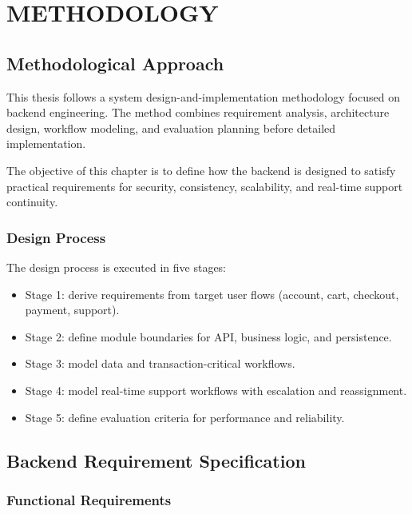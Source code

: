 ﻿\chapter{METHODOLOGY}
\label{ch:methodology}

\section{Methodological Approach}

This thesis follows a system design-and-implementation methodology focused on backend engineering. The method combines requirement analysis, architecture design, workflow modeling, and evaluation planning before detailed implementation.

The objective of this chapter is to define how the backend is designed to satisfy practical requirements for security, consistency, scalability, and real-time support continuity.

\subsection{Design Process}

The design process is executed in five stages:
\begin{itemize}
    \item Stage 1: derive requirements from target user flows (account, cart, checkout, payment, support).
    \item Stage 2: define module boundaries for API, business logic, and persistence.
    \item Stage 3: model data and transaction-critical workflows.
    \item Stage 4: model real-time support workflows with escalation and reassignment.
    \item Stage 5: define evaluation criteria for performance and reliability.
\end{itemize}

\section{Backend Requirement Specification}

\subsection{Functional Requirements}


